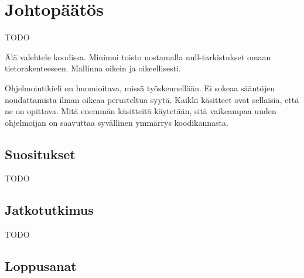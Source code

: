 \vspace{21.5pt}
\chapter{Johtopäätös}
TODO

Älä valehtele koodissa. Minimoi toisto nostamalla null-tarkistukset omaan tietorakenteeseen.
Mallinna oikein ja oikeellisesti.

Ohjelmointikieli on huomioitava, missä työskennellään. Ei sokeaa sääntöjen noudattamista ilman oikeaa perusteltua syytä. Kaikki käsitteet ovat sellaisia, että ne on opittava. Mitä enemmän käsitteitä käytetään, sitä vaikeampaa uuden ohjelmoijan on saavuttaa syvällinen ymmärrys koodikannasta.

\section{Suositukset}

TODO


\section{Jatkotutkimus}

TODO

\section{Loppusanat}


